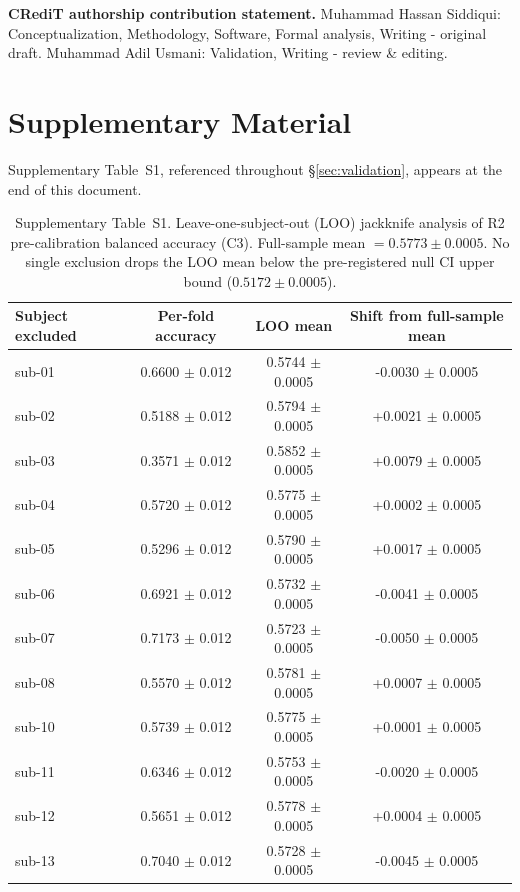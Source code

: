 \documentclass[preprint,12pt]{elsarticle}
\begin{document}
\textbf{CRediT authorship contribution statement.} Muhammad Hassan Siddiqui: Conceptualization, Methodology, Software, Formal analysis, Writing - original draft. Muhammad Adil Usmani: Validation, Writing - review \& editing.




\clearpage
\section*{Supplementary Material}
Supplementary Table~S1, referenced throughout \S\ref{sec:validation}, appears at the end of this document.

\begin{table}[!p]
\caption{Supplementary Table~S1. Leave-one-subject-out (LOO) jackknife analysis of R2 pre-calibration balanced accuracy (C3). Full-sample mean $= 0.5773 \pm 0.0005$. No single exclusion drops the LOO mean below the pre-registered null CI upper bound ($ 0.5172 \pm 0.0005$).}
\label{tab:s1}
\centering
\begin{tabular}{lccc}
\toprule
Subject excluded & Per-fold accuracy & LOO mean & Shift from full-sample mean \\
\midrule
sub-01 & 0.6600 $\pm$ 0.012 & 0.5744 $\pm$ 0.0005 & -0.0030 $\pm$ 0.0005 \\
sub-02 & 0.5188 $\pm$ 0.012 & 0.5794 $\pm$ 0.0005 & +0.0021 $\pm$ 0.0005 \\
sub-03 & 0.3571 $\pm$ 0.012 & 0.5852 $\pm$ 0.0005 & +0.0079 $\pm$ 0.0005 \\
sub-04 & 0.5720 $\pm$ 0.012 & 0.5775 $\pm$ 0.0005 & +0.0002 $\pm$ 0.0005 \\
sub-05 & 0.5296 $\pm$ 0.012 & 0.5790 $\pm$ 0.0005 & +0.0017 $\pm$ 0.0005 \\
sub-06 & 0.6921 $\pm$ 0.012 & 0.5732 $\pm$ 0.0005 & -0.0041 $\pm$ 0.0005 \\
sub-07 & 0.7173 $\pm$ 0.012 & 0.5723 $\pm$ 0.0005 & -0.0050 $\pm$ 0.0005 \\
sub-08 & 0.5570 $\pm$ 0.012 & 0.5781 $\pm$ 0.0005 & +0.0007 $\pm$ 0.0005 \\
sub-10 & 0.5739 $\pm$ 0.012 & 0.5775 $\pm$ 0.0005 & +0.0001 $\pm$ 0.0005 \\
sub-11 & 0.6346 $\pm$ 0.012 & 0.5753 $\pm$ 0.0005 & -0.0020 $\pm$ 0.0005 \\
sub-12 & 0.5651 $\pm$ 0.012 & 0.5778 $\pm$ 0.0005 & +0.0004 $\pm$ 0.0005 \\
sub-13 & 0.7040 $\pm$ 0.012 & 0.5728 $\pm$ 0.0005 & -0.0045 $\pm$ 0.0005 \\

\end{tabular}
\end{table}
\end{document}
